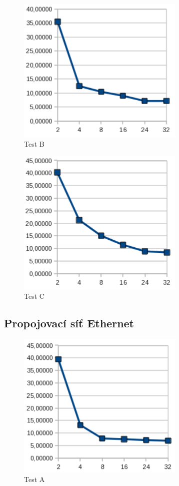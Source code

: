 \documentclass[12pt]{article}
\begin{document}
\begin{figure}[h]
\begin{center}
\includegraphics[width=8cm]{grafy-zprava/testBinfib.png}
\caption{Test B}
\label{fig:testBinfib}
\end{center}
\end{figure}

\begin{figure}[h]
\begin{center}
\includegraphics[width=8cm]{grafy-zprava/testCinfib.png}
\caption{Test C}
\label{fig:testCinfib}
\end{center}
\end{figure}

\subsection{Propojovací síť Ethernet}
\begin{figure}[h]
\begin{center}
\includegraphics[width=8cm]{grafy-zprava/testAeth.png}
\caption{Test A}
\label{fig:testAether}
\end{center}
\end{figure}
\end{document}

